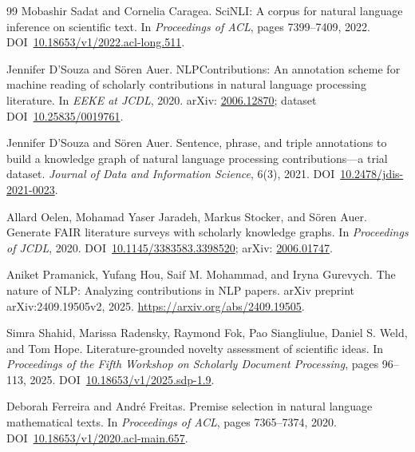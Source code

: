 \begin{thebibliography}{99}
Mobashir Sadat and Cornelia Caragea.
\newblock SciNLI: A corpus for natural language inference on scientific text.
\newblock In \emph{Proceedings of ACL}, pages 7399--7409, 2022.
\newblock DOI~\href{https://doi.org/10.18653/v1/2022.acl-long.511}{10.18653/v1/2022.acl-long.511}.

Jennifer D'Souza and S\"oren Auer.
\newblock NLPContributions: An annotation scheme for machine reading of scholarly contributions in natural language processing literature.
\newblock In \emph{EEKE at JCDL}, 2020.
\newblock arXiv: \href{https://arxiv.org/abs/2006.12870}{2006.12870}; dataset DOI~\href{https://doi.org/10.25835/0019761}{10.25835/0019761}.

Jennifer D'Souza and S\"oren Auer.
\newblock Sentence, phrase, and triple annotations to build a knowledge graph of natural language processing contributions---a trial dataset.
\newblock \emph{Journal of Data and Information Science}, 6(3), 2021.
\newblock DOI~\href{https://doi.org/10.2478/jdis-2021-0023}{10.2478/jdis-2021-0023}.

Allard Oelen, Mohamad Yaser Jaradeh, Markus Stocker, and S\"oren Auer.
\newblock Generate FAIR literature surveys with scholarly knowledge graphs.
\newblock In \emph{Proceedings of JCDL}, 2020.
\newblock DOI~\href{https://doi.org/10.1145/3383583.3398520}{10.1145/3383583.3398520}; arXiv: \href{https://arxiv.org/abs/2006.01747}{2006.01747}.

Aniket Pramanick, Yufang Hou, Saif M. Mohammad, and Iryna Gurevych.
\newblock The nature of NLP: Analyzing contributions in NLP papers.
\newblock arXiv preprint arXiv:2409.19505v2, 2025.
\newblock \url{https://arxiv.org/abs/2409.19505}.

Simra Shahid, Marissa Radensky, Raymond Fok, Pao Siangliulue, Daniel S. Weld, and Tom Hope.
\newblock Literature-grounded novelty assessment of scientific ideas.
\newblock In \emph{Proceedings of the Fifth Workshop on Scholarly Document Processing}, pages 96--113, 2025.
\newblock DOI~\href{https://doi.org/10.18653/v1/2025.sdp-1.9}{10.18653/v1/2025.sdp-1.9}.

Deborah Ferreira and Andr\'e Freitas.
\newblock Premise selection in natural language mathematical texts.
\newblock In \emph{Proceedings of ACL}, pages 7365--7374, 2020.
\newblock DOI~\href{https://doi.org/10.18653/v1/2020.acl-main.657}{10.18653/v1/2020.acl-main.657}.

\end{thebibliography}